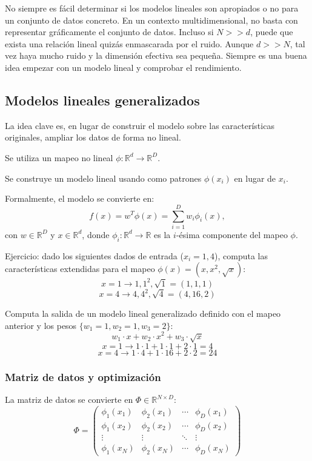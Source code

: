 No siempre es fácil determinar si los modelos lineales son apropiados o no para un conjunto de datos concreto. En un contexto multidimensional, no basta con representar gráficamente el conjunto de datos. Incluso si $N >> d$, puede que exista una relación lineal quizás enmascarada por el ruido. Aunque $d >> N$, tal vez haya mucho ruido y la dimensión efectiva sea pequeña. Siempre es una buena idea empezar con un modelo lineal y comprobar el rendimiento.

\subsection{Modelos lineales generalizados}
La idea clave es, en lugar de construir el modelo sobre las características originales, ampliar los datos de forma no lineal. 

Se utiliza un mapeo no lineal $\phi: \mathbb{R}^d \to \mathbb{R}^D$.

Se construye un modelo lineal usando como patrones $\phi(x_i)$ en lugar de $x_i$.

Formalmente, el modelo se convierte en:
$$f(x) = w^T \phi(x) = \sum_{i=1}^D w_i \phi_i(x),$$
con $w \in \mathbb{R}^D$ y $x \in \mathbb{R}^d$, donde $\phi_i : \mathbb{R}^d \to \mathbb{R}$ es la $i$-ésima componente del mapeo $\phi$.

Ejercicio: dado los siguientes dados de entrada ($x_i = 1, 4$), computa las características extendidas para el mapeo $\phi(x) = (x, x^2, \sqrt{x})$:
$$x = 1 \rightarrow 1, 1^2, \sqrt{1} = (1, 1, 1)$$
$$x = 4 \rightarrow 4, 4^2, \sqrt{4} = (4, 16, 2)$$

Computa la salida de un modelo lineal generalizado definido con el mapeo anterior y los pesos $\{w_1 = 1, w_2 = 1, w_3 = 2\}$:
$$w_1 \cdot x + w_2 \cdot x^2 + w_3 \cdot \sqrt{x}$$
$$x = 1 \rightarrow 1 \cdot 1 + 1 \cdot 1 + 2 \cdot 1 = 4$$
$$x = 4 \rightarrow 1 \cdot 4 + 1 \cdot 16 + 2 \cdot 2 = 24$$

\subsubsection{Matriz de datos y optimización}

La matriz de datos se convierte en $\Phi \in \mathbb{R}^{N \times D}$:
$$ \Phi = 
\begin{pmatrix}
\phi_1(x_1) & \phi_2(x_1) & \cdots & \phi_D(x_1) \\
\phi_1(x_2) & \phi_2(x_2) & \cdots & \phi_D(x_2) \\
\vdots & \vdots & \ddots & \vdots \\
\phi_1(x_N) & \phi_2(x_N) & \cdots & \phi_D(x_N)
\end{pmatrix} $$

